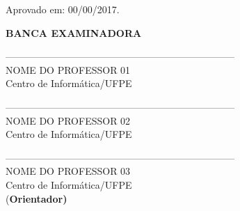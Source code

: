 \begin{folhadeaprovacao}


\begin{center}
	\textbf{\imprimirautor}
	
	\vspace{2\baselineskip}
	
	\textbf{\imprimirtitulo}
	
	\vspace{2\baselineskip}	
\end{center}


{%
	\hspace{.38\textwidth}
	\begin{minipage}{.48\textwidth}
		\imprimirpreambulo
	\end{minipage}%
}%

\vspace{2\baselineskip}	

\noindent
Aprovado em: 00/00/2017.

\vspace{2\baselineskip}	

\begin{center}

{\bfseries{BANCA EXAMINADORA}}
\vspace{3\baselineskip}

-----------------------------------------------------------------------\\
NOME DO PROFESSOR 01\\
Centro de Informática/UFPE

\vspace{\baselineskip}
\vspace{\baselineskip}
\vspace{\baselineskip}
-----------------------------------------------------------------------\\
NOME DO PROFESSOR 02\\
Centro de Informática/UFPE


\vspace{\baselineskip}
\vspace{\baselineskip}
\vspace{\baselineskip}
-----------------------------------------------------------------------\\
NOME DO PROFESSOR 03\\
Centro de Informática/UFPE\\
(\bfseries{Orientador})

\vfill

\end{center}

\end{folhadeaprovacao}